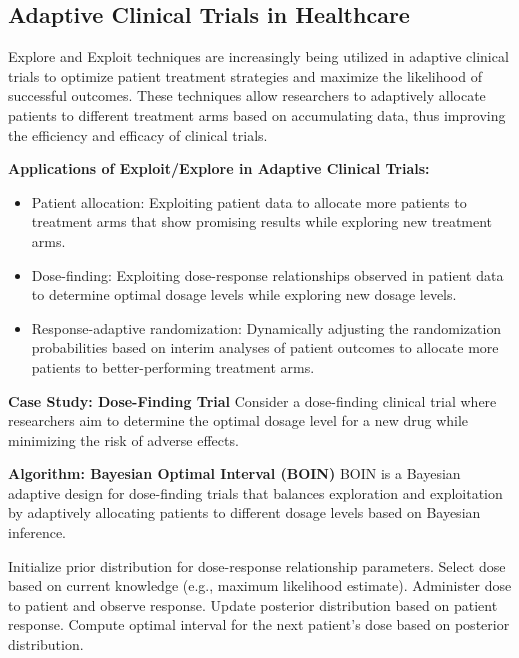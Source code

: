 \documentclass[12pt]{book} %
\begin{document}
\subsection{Adaptive Clinical Trials in Healthcare}
Explore and Exploit techniques are increasingly being utilized in adaptive clinical trials to optimize patient treatment strategies and maximize the likelihood of successful outcomes. These techniques allow researchers to adaptively allocate patients to different treatment arms based on accumulating data, thus improving the efficiency and efficacy of clinical trials.

\textbf{Applications of Exploit/Explore in Adaptive Clinical Trials:}
\begin{itemize}
    \item Patient allocation: Exploiting patient data to allocate more patients to treatment arms that show promising results while exploring new treatment arms.
    \item Dose-finding: Exploiting dose-response relationships observed in patient data to determine optimal dosage levels while exploring new dosage levels.
    \item Response-adaptive randomization: Dynamically adjusting the randomization probabilities based on interim analyses of patient outcomes to allocate more patients to better-performing treatment arms.
\end{itemize}

\textbf{Case Study: Dose-Finding Trial}
Consider a dose-finding clinical trial where researchers aim to determine the optimal dosage level for a new drug while minimizing the risk of adverse effects.

\textbf{Algorithm: Bayesian Optimal Interval (BOIN)}
BOIN is a Bayesian adaptive design for dose-finding trials that balances exploration and exploitation by adaptively allocating patients to different dosage levels based on Bayesian inference.
\FloatBarrier
\begin{algorithm}
\caption{Bayesian Optimal Interval for Dose-Finding}
\begin{algorithmic}[1]
\State Initialize prior distribution for dose-response relationship parameters.
    \State Select dose based on current knowledge (e.g., maximum likelihood estimate).
    \State Administer dose to patient and observe response.
    \State Update posterior distribution based on patient response.
    \State Compute optimal interval for the next patient's dose based on posterior distribution.
\EndFor
\end{algorithmic}
\end{algorithm}
\FloatBarrier
\end{document}
